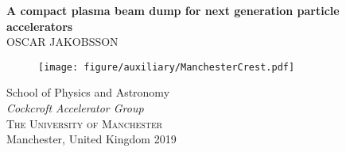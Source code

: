 \newpage
{}	%
\thispagestyle{empty}
\begin{center}
	\textbf{\Huge A compact plasma beam dump for next generation particle accelerators} \\[1cm]
	{\large OSCAR JAKOBSSON}
	
	\vfill	
	\begin{figure}[H]
	\centering
	\texttt{[image: figure/auxiliary/ManchesterCrest.pdf]} \\	
	\end{figure}	\vspace{5mm}	
	
	School of Physics and Astronomy \\
	\textit{Cockcroft Accelerator Group}\\
	\textsc{The University of Manchester} \\
	Manchester, United Kingdom 2019 \\
\end{center}








